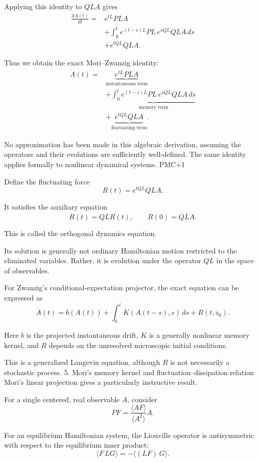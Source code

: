 Applying this identity to \(QLA\) gives
\[
\begin{aligned}
\frac{dA(t)}{dt}
={}&e^{tL}PLA\\
&+\int_0^t e^{(t-s)L}
PL\,e^{sQL}QLA\,ds\\
&+e^{tQL}QLA.
\end{aligned}
\]

Thus we obtain the exact Mori–Zwanzig identity:
\[
\boxed{
\begin{aligned}
\dot A(t)={}&
\underbrace{e^{tL}PLA}_{\text{instantaneous term}}\\
&+
\underbrace{\int_0^t
e^{(t-s)L}PL\,e^{sQL}QLA\,ds}_{\text{memory term}}\\
&+
\underbrace{e^{tQL}QLA}_{\text{fluctuating term}}.
\end{aligned}
}
\]

No approximation has been made in this algebraic derivation, assuming the operators and their evolutions are sufficiently well-defined. The same identity applies formally to nonlinear dynamical systems. 
PMC+1


Define the fluctuating force
\[
R(t)=e^{tQL}QLA.
\]

It satisfies the auxiliary equation
\[
\dot R(t)=QLR(t),
\qquad R(0)=QLA.
\]

This is called the orthogonal dynamics equation.

Its solution is generally not ordinary Hamiltonian motion restricted to the eliminated variables. Rather, it is evolution under the operator \(QL\) in the space of observables.

For Zwanzig's conditional-expectation projector, the exact equation can be expressed as
\[
\boxed{
\dot A(t)=
b(A(t))
+\int_0^t K(A(t-s),s)\,ds
+R(t,z_0).
}
\]

Here \(b\) is the projected instantaneous drift, \(K\) is a generally nonlinear memory kernel, and \(R\) depends on the unresolved microscopic initial conditions.

This is a generalized Langevin equation, although \(R\) is not necessarily a stochastic process.
5. Mori's memory kernel and fluctuation–dissipation relation
Mori's linear projection gives a particularly instructive result.

For a single centered, real observable \(A\), consider
\[
PF=\frac{\langle AF\rangle}{\langle A^2\rangle}A.
\]

For an equilibrium Hamiltonian system, the Liouville operator is antisymmetric with respect to the equilibrium inner product:
\[
\langle F\,LG\rangle=-\langle (LF)\,G\rangle.
\]

